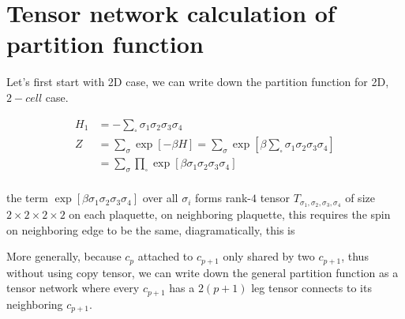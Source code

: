\documentclass[11pt]{article}
\begin{document}
\section{Tensor network calculation of partition function}

Let's first start with 2D case, we can write down the partition function for 2D, $2-cell$
case.

$$
\begin{aligned}
    H_1 &= -\sum_{\square} \sigma_1 \sigma_2 \sigma_3 \sigma_4\\
    Z &= \sum_{\sigma}\exp[-\beta H] = \sum_{\sigma}\exp[\beta \sum_{\square} \sigma_1 \sigma_2 \sigma_3 \sigma_4]\\
    &=\sum_{\sigma}\prod_{\square} \exp[\beta \sigma_1\sigma_2\sigma_3\sigma_4]\\
\end{aligned}
$$

the term $\exp[\beta \sigma_1\sigma_2\sigma_3\sigma_4]$
over all $\sigma_i$ forms rank-$4$ tensor $T_{\sigma_1,\sigma_2,\sigma_3,\sigma_4}$
of size $2\times 2\times 2\times 2$ on each plaquette,
on neighboring plaquette, this requires the spin on neighboring
edge to be the same, diagramatically, this is

\begin{figure}[h]
    \centering
    
\end{figure}

More generally, because $c_p$ attached to $c_{p+1}$ only
shared by two $c_{p+1}$, thus without using copy tensor,
we can write down the general partition function as a tensor
network where every $c_{p+1}$ has a $2(p+1)$ leg tensor
connects to its neighboring $c_{p+1}$.



\end{document}
